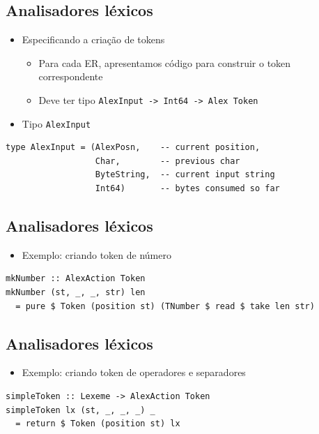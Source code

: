 \documentclass[11pt]{article}
\begin{document}
\subsection*{Analisadores léxicos}
\label{sec:org7eb3f2d}

\begin{itemize}
\item Especificando a criação de tokens
\begin{itemize}
\item Para cada ER, apresentamos código para construir o token correspondente
\item Deve ter tipo \texttt{AlexInput -> Int64 -> Alex Token}
\end{itemize}
\item Tipo \texttt{AlexInput}
\end{itemize}

\begin{verbatim}
type AlexInput = (AlexPosn,    -- current position,
                  Char,        -- previous char
                  ByteString,  -- current input string
                  Int64)       -- bytes consumed so far
\end{verbatim}
\subsection*{Analisadores léxicos}
\label{sec:orga04cf25}

\begin{itemize}
\item Exemplo: criando token de número
\end{itemize}

\begin{verbatim}
mkNumber :: AlexAction Token
mkNumber (st, _, _, str) len
  = pure $ Token (position st) (TNumber $ read $ take len str)
\end{verbatim}
\subsection*{Analisadores léxicos}
\label{sec:orgcfcabdf}

\begin{itemize}
\item Exemplo: criando token de operadores e separadores
\end{itemize}

\begin{verbatim}
simpleToken :: Lexeme -> AlexAction Token
simpleToken lx (st, _, _, _) _
  = return $ Token (position st) lx
\end{verbatim}
\end{document}

